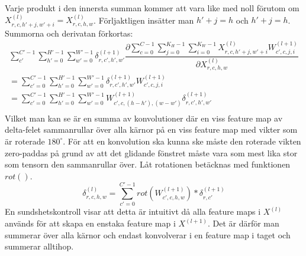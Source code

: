 \documentclass[a4paper,11pt,twoside]{article}
\newcommand*{\pd}[2]{\ensuremath{\dfrac{\partial #1}{\partial #2}}}
\begin{document}
Varje produkt i den innersta summan kommer att vara like med noll förutom om $X^{(l)}_{r, c, h'+j, w'+i} = X^{(l)}_{r,c,h,w}$. Förljaktligen insätter man $h'+j = h$ och $h'+j = h$. Summorna och derivatan förkortas: \cite{webconv1} \cite{webconv2} \cite{webconv3}
\begin{multline}
\sum^{C'-1}_{c'} \sum^{H'-1}_{h'=0} \sum^{W'-1}_{w'=0} \delta^{(l+1)}_{r,c',h',w'} \pd{\sum^{C-1}_{c=0} \sum^{K_H-1}_{j=0} \sum^{K_W-1}_{i=0} X^{(l)}_{r, c, h'+j, w'+i}W^{(l+1)}_{c', c, j, i}}{X^{(l)}_{r,c,h,w}} \\
	 = \sum^{C'-1}_{c'=0} \sum^{H'-1}_{h'=0} \sum^{W'-1}_{w'=0} \delta^{(l+1)}_{r,c',h',w'} W^{(l+1)}_{c', c, j, i} \\
	 = \sum^{C'-1}_{c'=0} \sum^{H'-1}_{h'=0} \sum^{W'-1}_{w'=0} W^{(l+1)}_{c', c, (h-h'), (w-w')}  \delta^{(l+1)}_{r,c',h',w'}   \\
\end{multline}
Vilket man kan se är en summa av konvolutioner där en viss feature map av delta-felet sammanrullar över alla kärnor på en viss feature map med vikter som är roterade $180^\circ$. För att en konvolution ska kunna ske måste den roterade vikten zero-paddas på grund av att det glidande fönstret måste vara som mest lika stor som tensorn den sammanrullar över. Låt rotationen betäcknas med funktionen $rot()$. \cite{webconv1} \cite{webconv2} \cite{webconv3}
\begin{equation}
\delta^{(l)}_{r,c,h,w} = \sum^{C'-1}_{c'=0} rot(W^{(l+1)}_{c',c,h,w}) * \delta^{(l+1)}_{r,c'}
\end{equation}
En sundshetskontroll visar att detta är intuitivt då alla feature maps i $X^{(l)}$ används för att skapa en enstaka feature map i $X^{(l+1)}$. Det är därför man summerar över alla kärnor och endast konvolverar i en feature map i taget och summerar alltihop. \cite{cs231n}
\end{document}
